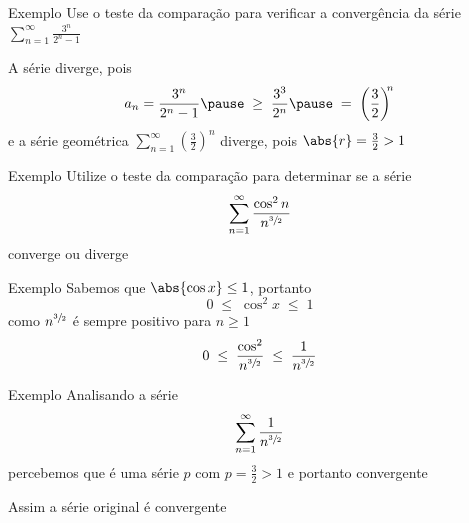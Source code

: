 \documentclass[fleqn,utf8,aspectratio=169,12pt]{beamer}
\begin{document}
\addtocounter{exemplo}{1}
\begin{frame}{Exemplo \theexemplo}
  Use o teste da comparação para verificar a convergência da série
  \(
    \sum_{n=1}^\infty\frac{3^n}{2^n-1}
  \)

  \pause
  \vspace{\baselineskip}
  A série diverge\pause,
  pois
  \[
    a_n = \frac{3^n}{2^n-1}
    \pause
    \;\geq\; \frac{3^3}{2^n}
    \pause
    \;=\;    \left(\frac{3}{2}\right)^{\!\!{n}}
  \]
  \pause
  e a série geométrica
  \(
    \sum_{n=1}^\infty\left(\frac{3}{2}\right)^{\!\!{n}}
  \)
  diverge\pause, pois \quad
  \(
    \abs{r}=\frac{3}{2}>1
  \)
\end{frame}

\addtocounter{exemplo}{1}
\begin{frame}{Exemplo \theexemplo}
  Utilize o teste da comparação para determinar se a série
  \[
    \sum_{n=1}^{\infty} \frac{\cos^2 n}{n^{\sfrac{3}{2}}}
  \]
  converge ou diverge
\end{frame}

\begin{frame}{Exemplo \theexemplo}
  Sabemos que \(\abs{\cos x}\leq 1\)\pause,
  portanto
  \[
    0 \;\leq\;\cos^2 x \;\leq\; 1
  \]
  \pause
  como $n^{\sfrac{3}{2}}$ é sempre positivo para $n\geq 1$
  \[
    0 \;\leq\; \frac{\cos^2}{n^{\sfrac{3}{2}}} \;\leq\; \frac{1}{n^{\sfrac{3}{2}}}
  \]
\end{frame}

\begin{frame}{Exemplo \theexemplo}
  Analisando a série
  \[
    \sum_{n=1}^{\infty} \frac{1}{n^{\sfrac{3}{2}}}
  \]
  percebemos que é uma série $p$ com $p=\frac{3}{2}>1$ e portanto convergente

  \pause
  \vspace{1.5\baselineskip}
  Assim a série original é convergente
\end{frame}
\end{document}
